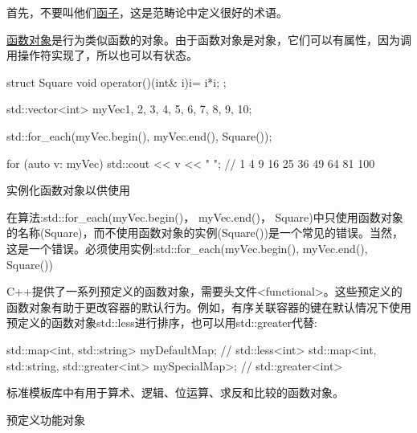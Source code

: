 首先，不要叫他们\href{https://en.wikipedia.org/wiki/Functor}{函子}，这是范畴论中定义很好的术语。

\href{http://en.cppreference.com/w/cpp/utility/functional}{函数对象}是行为类似函数的对象。由于函数对象是对象，它们可以有属性，因为调用操作符实现了，所以也可以有状态。

\begin{cpp}
struct Square{
	void operator()(int& i){i= i*i;}
};

std::vector<int> myVec{1, 2, 3, 4, 5, 6, 7, 8, 9, 10};

std::for_each(myVec.begin(), myVec.end(), Square());

for (auto v: myVec) std::cout << v << " "; // 1 4 9 16 25 36 49 64 81 100
\end{cpp}

\begin{myTip}{实例化函数对象以供使用}
	
在算法:std::for\_each(myVec.begin()， myVec.end()， Square)中只使用函数对象的名称(Square)，而不使用函数对象的实例(Square())是一个常见的错误。当然，这是一个错误。必须使用实例:std::for\_each(myVec.begin(), myVec.end(), Square())
\end{myTip}


C++提供了一系列预定义的函数对象，需要头文件<functional>。这些预定义的函数对象有助于更改容器的默认行为。例如，有序关联容器的键在默认情况下使用预定义的函数对象std::less进行排序，也可以用std::greater代替:

\begin{cpp}
std::map<int, std::string> myDefaultMap; // std::less<int>
std::map<int, std::string, std::greater<int> mySpecialMap>; // std::greater<int>
\end{cpp}

标准模板库中有用于算术、逻辑、位运算、求反和比较的函数对象。

\begin{center}
预定义功能对象
\end{center}

